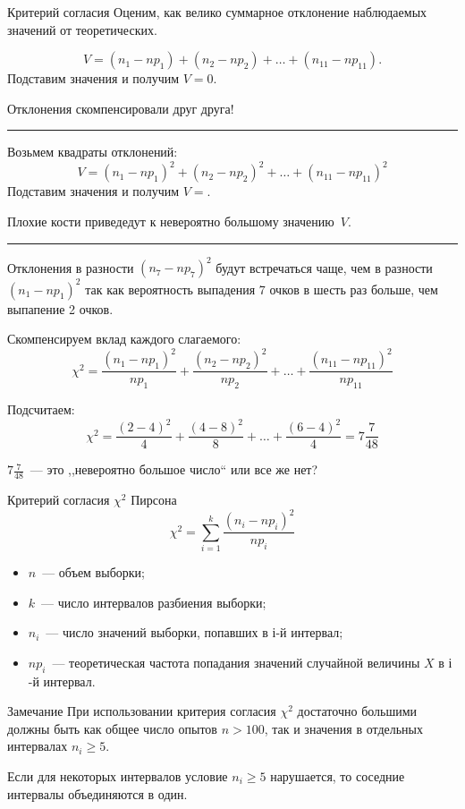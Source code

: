 \documentclass[unicode,11pt,notheorems,xcolor=table]{beamer}
\begin{document}
\begin{frame}[allowframebreaks]{Критерий согласия}{}
    Оценим, как велико суммарное отклонение наблюдаемых значений от теоретических.

    $$
        V = (n_1-np_1) + (n_2-np_2) + \ldots + (n_{11}-np_{11}).
    $$
    Подставим значения и получим $V=0$.

    Отклонения скомпенсировали друг друга!

    \medskip
    \hrule
    \medskip

    Возьмем квадраты отклонений:
    $$
        V = (n_1-np_1)^2 + (n_2-np_2)^2 + \ldots + (n_{11}-np_{11})^2
    $$
    Подставим значения и получим $V=$.

    Плохие кости приведедут к невероятно большому значению~$V$.
    
    \medskip
    \hrule
    \medskip
     Отклонения в разности $(n_7-np_7)^2$ будут встречаться чаще, чем в разности  $(n_1-np_1)^2$ так как вероятность выпадения 7 очков в шесть раз больше, чем выпапение 2 очков.
    \medskip

    Скомпенсируем вклад каждого слагаемого:
    $$
        \chi^2 = \frac{(n_1-np_1)^2}{np_1} + \frac{(n_2-np_2)^2}{np_2} + \ldots + \frac{(n_{11}-np_{11})^2}{np_{11}}
    $$
    
    Подсчитаем:
    $$
        \chi^2 = \frac{(2-4)^2}{4} + \frac{(4-8)^2}{8} + \ldots + \frac{(6-4)^2}{4} = 7\frac{7}{48}
    $$

     $7\frac{7}{48}$~--- это ,,невероятно большое число`` или все же нет?
    
\end{frame}
\begin{frame}{Критерий согласия $\chi^2$ Пирсона}{}
    $$
        \chi^2 = \sum_{i=1}^{k} \frac{(n_i-np_i)^2}{np_i}
    $$
    \begin{itemize}
        \item $n$~--- объем выборки;
        \item $k$~--- число интервалов разбиения выборки;
        \item $n_i$~--- число значений выборки, попавших в $і$-й интервал;
        \item $np_i$~--- теоретическая частота попадания значений  случайной величины $X$ в $і$-й интервал.
    \end{itemize}

    \begin{block}{Замечание}
        При использовании критерия согласия $\chi^2$ достаточно большими должны быть как общее число опытов $n>100$, так и значения  в отдельных интервалах $n_i \geqslant 5$.
 
        \alert{Если для некоторых интервалов условие $n_i \geqslant 5$ нарушается, то соседние интервалы объединяются в один.}
    \end{block}
\end{frame}
\end{document}
